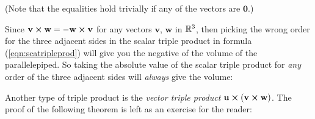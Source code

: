 
\par\noindent(Note that the equalities hold trivially if any of the vectors are $\mathbf{0}$.)\smallskip

Since $\mathbf{v} \bm{\times} \mathbf{w} = -\mathbf{w} \bm{\times} \mathbf{v}$ for any vectors $\mathbf{v}$, $\mathbf{w}$
in $\mathbb{R}^{3}$, then picking the wrong order for the three adjacent sides in the scalar triple product in formula
(\ref{eqn:scatripleprod}) will give you the negative of the volume of the parallelepiped. So
taking the absolute value of the scalar triple product for \emph{any} order of the three adjacent sides will
\emph{always} give the volume:


Another type of triple product is the \emph{vector triple product}
$\mathbf{u} \bm{\times} (\mathbf{v} \bm{\times} \mathbf{w})$. The proof of the following theorem is left as an
exercise for the reader:

